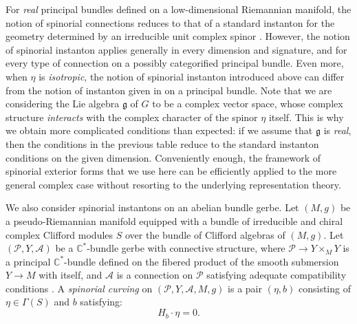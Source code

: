 \documentclass[10pt,a4paper,twoside,reqno]{amsart}
\theoremstyle{plain}
\theoremstyle{definition}
\theoremstyle{remark}
\def\C{\mathbb{C}}
\def\frg{\mathfrak{g}}
\def\cA{\mathcal{A}}
\def\cP{\mathcal{P}}
\def\cP{\mathcal{P}}
\begin{document}
For \emph{real} principal bundles defined on a low-dimensional Riemannian manifold, the notion of spinorial connections reduces to that of a standard instanton for the geometry determined by an irreducible unit complex spinor \cite{Carrion}. However, the notion of spinorial instanton applies generally in every dimension and signature, and for every type of connection on a possibly categorified principal bundle. Even more, when $\eta$ is \emph{isotropic}, the notion of spinorial instanton introduced above can differ from the notion of instanton given in \cite{Carrion} on a principal bundle. Note that we are considering the Lie algebra $\frg$ of $G$ to be a complex vector space, whose complex structure \emph{interacts} with the complex character of the spinor $\eta$ itself. This is why we obtain more complicated conditions than expected: if we assume that $\frg$ is \emph{real}, then the conditions in the previous table reduce to the standard instanton conditions on the given dimension. Conveniently enough, the framework of spinorial exterior forms that we use here can be efficiently applied to the more general complex case without resorting to the underlying representation theory.\medskip

\noindent
We also consider spinorial instantons on an abelian bundle gerbe. Let $(M,g)$ be a pseudo-Riemannian manifold equipped with a bundle of irreducible and chiral complex Clifford modules $S$ over the bundle of Clifford algebras of $(M,g)$. Let $(\cP, Y, \cA)$ be a $\mathbb{C}^{\ast}$-bundle gerbe with connective structure, where $\cP\to Y\times_M Y$ is a principal $\C^*$-bundle defined on the fibered product of the smooth submersion $Y\to M$ with itself, and $\cA$ is a connection on $\cP$ satisfying adequate compatibility conditions \cite{Brylinski1993,Bunk2021,Giraud1971,Murray1996}. A \emph{spinorial curving} on $(\cP, Y, \cA,M,g)$ is a pair $(\eta,b)$ consisting of $\eta\in \Gamma(S)$ and $b$ satisfying:
\begin{equation*}
H_b\cdot \eta = 0.
\end{equation*}
\end{document}
